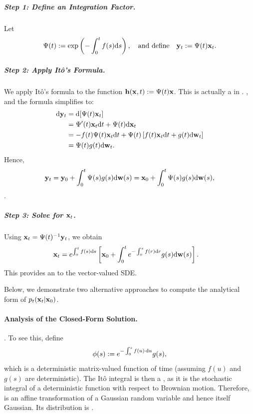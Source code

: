 \subparagraph{Step 1: Define an Integration Factor.} Let
\[
\Psi(t) := \exp\left( -\int_0^t f(s) \mathrm{d}s \right),
\quad \text{and define} \quad
{\mathbf{y}}_t := \Psi(t){\mathbf{x}}_t.
\]
\subparagraph{Step 2: Apply It\^o's Formula.}  
We apply It\^o's formula to the function ${\mathbf{h}}({\mathbf{x}}, t) := \Psi(t){\mathbf{x}}$. This is actually a  in . , and the formula simplifies to:
\begin{align*}
    \mathrm{d}{\mathbf{y}}_t 
    &= \mathrm{d}[\Psi(t){\mathbf{x}}_t] \\
    &= \Psi'(t){\mathbf{x}}_t \mathrm{d}t + \Psi(t) \mathrm{d}{\mathbf{x}}_t \\
    &= -f(t)\Psi(t){\mathbf{x}}_t \mathrm{d}t + \Psi(t)\left[f(t){\mathbf{x}}_t \mathrm{d}t + g(t) \mathrm{d}{\mathbf{w}}_t\right] \\
    &= \Psi(t)g(t) \mathrm{d}{\mathbf{w}}_t.
\end{align*}
Hence,
\[
{\mathbf{y}}_t = {\mathbf{y}}_0 + \int_0^t \Psi(s)g(s) \mathrm{d}{\mathbf{w}}(s) = {\mathbf{x}}_0 + \int_0^t \Psi(s)g(s) \mathrm{d}{\mathbf{w}}(s),
\]
.
\subparagraph{Step 3: Solve for ${\mathbf{x}}_t$.}  
Using ${\mathbf{x}}_t = \Psi(t)^{-1}{\mathbf{y}}_t$, we obtain
\begin{align}\label{eq:lienar-sde-solution}
    {\mathbf{x}}_t &=  e^{ \int_0^t f(s)\mathrm{d}s}
    \left[ {\mathbf{x}}_0 + \int_0^t e^{ -\int_0^s f(r) \mathrm{d}r } g(s) \mathrm{d}{\mathbf{w}}(s) \right].
\end{align}
This provides an  to the vector-valued SDE.

Below, we demonstrate two alternative approaches to compute the analytical form of $p_t({\mathbf{x}}_t|{\mathbf{x}}_0)$.

\paragraph{Analysis of the Closed-Form Solution.}  . To see this, define
\[
\phi(s) := e^{-\int_0^s f(u) \mathop{}\!\mathrm{d} u} g(s),
\]
which is a deterministic matrix-valued function of time (assuming $f(u)$ and $g(s)$ are deterministic). The It\^o integral  is then a , as it is the stochastic integral of a deterministic function with respect to Brownian motion. Therefore,  is an affine transformation of a Gaussian random variable and hence itself Gaussian. Its distribution is .

